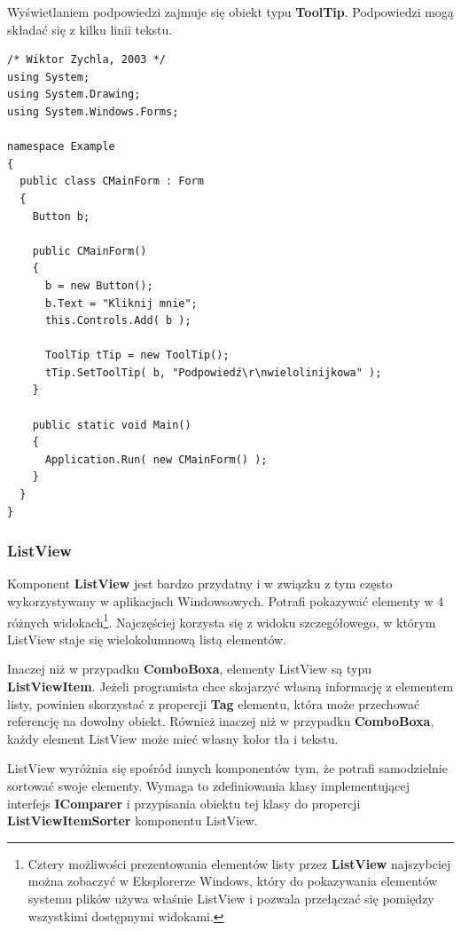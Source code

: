 Wyświetlaniem podpowiedzi zajmuje się obiekt typu {\bf ToolTip}. Podpowiedzi mogą składać się
z kilku linii tekstu. 

\begin{scriptsize}
\begin{verbatim}
/* Wiktor Zychla, 2003 */
using System;
using System.Drawing;
using System.Windows.Forms;

namespace Example
{
  public class CMainForm : Form
  {   
    Button b; 

    public CMainForm()
    {
      b = new Button();
      b.Text = "Kliknij mnie";
      this.Controls.Add( b );

      ToolTip tTip = new ToolTip();
      tTip.SetToolTip( b, "Podpowiedź\r\nwielolinijkowa" );
    } 

    public static void Main()
    {
      Application.Run( new CMainForm() );
    }
  }
}
\end{verbatim}
\end{scriptsize}

\subsubsection{ListView}

Komponent {\bf ListView} jest bardzo przydatny i w związku z tym często wykorzystywany w aplikacjach
Windowsowych. Potrafi pokazywać elementy w 4 różnych widokach\footnote{Cztery możliwości prezentowania
elementów listy przez {\bf ListView} najszybciej można zobaczyć w Eksplorerze Windows, który do pokazywania
elementów systemu plików używa właśnie ListView i pozwala przełączać się pomiędzy wszystkimi dostępnymi
widokami.}. Najczęściej korzysta się z widoku szczegółowego, w którym ListView staje się wielokolumnową listą
elementów. 

Inaczej niż w przypadku {\bf ComboBoxa}, elementy ListView są typu {\bf ListViewItem}. Jeżeli programista
chce skojarzyć własną informację z elementem listy, powinien skorzystać z propercji {\bf Tag} elementu, 
która może przechować referencję na dowolny obiekt. Również inaczej niż w przypadku {\bf ComboBoxa}, każdy
element ListView może mieć własny kolor tła i tekstu.

ListView wyróżnia się spośród innych komponentów tym, że potrafi samodzielnie sortować swoje elementy.
Wymaga to zdefiniowania klasy implementującej interfejs {\bf IComparer} i przypisania obiektu tej klasy do
propercji {\bf ListViewItemSorter} komponentu ListView.

